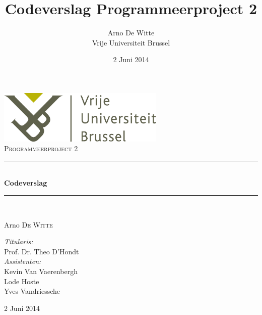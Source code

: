 \documentclass{article}
\title{Codeverslag Programmeerproject 2}
\author{Arno De Witte\\
Vrije Universiteit Brussel}
\date{2 Juni 2014}
\newcommand{\HRule}{\rule{\linewidth}{0.5mm}}
\newcommand{\thedate}{2 Juni 2014}
\begin{document}
\begin{titlepage}
\begin{center}

\includegraphics[width=0.60\textwidth]{./VUB_logo_compact.jpg}~\\[1cm]


\textsc{\Large Programmeerproject 2}\\[0.5cm]

\HRule \\[0.4cm]
{ \huge \bfseries Codeverslag}\\[0.4cm]

\HRule \\[1.5cm]

\begin{minipage}{0.4\textwidth}
\begin{flushleft} \large
Arno \textsc{De Witte}\\
\end{flushleft}
\end{minipage}
\begin{minipage}{0.5\textwidth}
\begin{flushright} \large
\emph{Titularis:}\\ Prof. Dr. Theo D’Hondt\\
\emph{Assistenten:}\\ Kevin Van Vaerenbergh\\
Lode Hoste\\
Yves Vandriessche
\end{flushright}
\end{minipage}

\vfill

{\large \thedate}

\end{center}
\end{titlepage}

\newpage
\tableofcontents
\newpage
\end{document}
